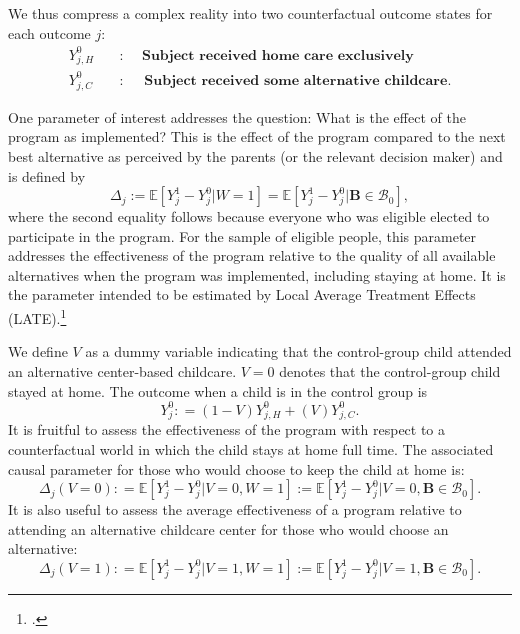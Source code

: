 We thus compress a complex reality into two counterfactual outcome states for each outcome $j$:
\begin{align*}
Y_{j,H}^0 \quad &: \quad \textbf{ Subject received home care exclusively} \\
Y_{j,C}^0 \quad &: \quad \textbf{ Subject received some alternative childcare}.
\end{align*}


One parameter of interest addresses the question: What is the effect of the program as implemented? This is the effect of the program compared to the next best alternative as perceived by the parents (or the relevant decision maker) and is defined by
\begin{equation}\label{eq:effect}
\Delta_j := \mathbb{E} \left[ Y_{j}^1 -  Y_{j}^0 | W =1 \right] = \mathbb{E} \left[Y_{j}^1 -  Y_{j}^0 | \bm{B} \in \mathcal{B}_0 \right],
\end{equation}
where the second equality follows because everyone who was eligible elected to participate in the program. For the sample of eligible people, this parameter addresses the effectiveness of the program relative to the quality of all available alternatives when the program was implemented, including staying at home. It is the parameter intended to be estimated by Local Average Treatment Effects (LATE).\footnote{\citet{Imbens_Angrist_1994_Econometrica}.}

We define $V$ as a dummy variable indicating that the control-group child attended an alternative center-based childcare. $V=0$ denotes that the control-group child stayed at home. The outcome when a child is in the control group is
\begin{equation}
Y_{j}^0 : = \left( 1 - V \right) Y_{j,H}^0 + \left( V \right) Y_{j,C}^0. \label{eq:meandiff}
\end{equation}
\noindent It is fruitful to assess the effectiveness of the program with respect to a counterfactual world in which the child stays at home full time. The associated causal parameter for those who would choose to keep the child at home is:
\begin{equation}\label{eq:cont1}
\Delta_j \left(V = 0 \right) : =   \mathbb{E} \left[ Y_{j}^1 -  Y_{j}^0 | V = 0, W = 1 \right] := \mathbb{E} \left[Y_{j}^1 -  Y_{j}^0 | V = 0, \bm{B} \in \mathcal{B}_0 \right].
\end{equation}
It is also useful to assess the average effectiveness of a program relative to attending an alternative childcare center for those who would choose an alternative:
\begin{equation}\label{eq:cont2}
\Delta_j \left( V =1 \right) : =   \mathbb{E} \left[ Y_{j}^1 -  Y_{j}^0 | V = 1, W = 1 \right] := \mathbb{E} \left[ Y_{j}^1 -  Y_{j}^0 | V = 1, \bm{B} \in \mathcal{B}_0 \right].
\end{equation}

